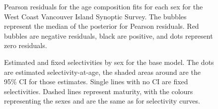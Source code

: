 \documentclass[11pt]{book}
\begin{document}
\begin{figure}[H]

{\centering {} 

}

\caption{Pearson residuals for the age composition fits for each sex for the West Coast Vancouver Island Synoptic Survey. The bubbles represent the median of the posterior for Pearson residuals. Red bubbles are negative residuals, black are positive, and dots represent zero residuals.}\label{fig:fig-base-age-resids-wcvis}
\end{figure}
\clearpage

\clearpage




\begin{figure}[H]

{\centering {} 

}

\caption{Estimated and fixed selectivities by sex for the base model. The dots are estimated selectivity-at-age, the shaded areas around are the 95\% CI for those estimates. Single lines with no CI are fixed selectivities. Dashed lines represent maturity, with the colours representing the sexes and are the same as for selectivity curves.}\label{fig:fig-base-mcmc-selex}
\end{figure}
\end{document}
